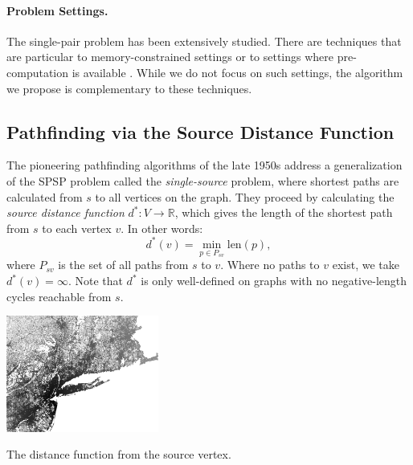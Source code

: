 \paragraph{Problem Settings.}
The single-pair problem has been extensively studied.
There are techniques that are particular to memory-constrained
settings \citep{kaindl1997biheurreconsidered}
or to settings where pre-computation is available
\citep{goldberg2007pointtopoint}.
While we do not focus on such settings,
the algorithm we propose is complementary to these techniques.

\subsection{Pathfinding via the Source Distance Function}

The pioneering pathfinding algorithms of the late 1950s address
a generalization of the SPSP problem called
the \emph{single-source} problem,
where shortest paths are calculated from $s$ to all vertices on
the graph.
They proceed by calculating the \emph{source distance function}
$d^* : V \rightarrow \mathbb{R}$,
which gives the length of the shortest path from $s$
to each vertex $v$.
In other words:
\begin{equation}
   d^*(v) = \min_{p \in P_{sv}} \mbox{len}(p),
   \label{eqn:ibid-distance-function-global}
\end{equation}
where $P_{sv}$ is the set of all paths from $s$ to $v$.
Where no paths to $v$ exist,
we take $d^*(v) = \infty$.
Note that $d^*$ is only well-defined on graphs with no negative-length
cycles reachable from $s$.

\begin{marginfigure}%
   \centering%
   \includegraphics[width=5cm]{figs/incbi-road-ne/singleshot/example-dijkstraall.png}%
   \caption{The distance function from the source vertex.}%
   \label{fig:ibid:example-distance-all}%
\end{marginfigure}

